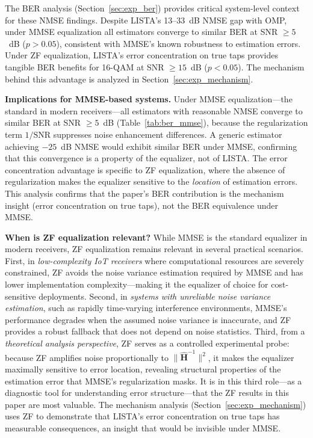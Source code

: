 \documentclass[a4paper,fleqn]{cas-sc}
\begin{document}
The BER analysis (Section~\ref{sec:exp_ber}) provides critical system-level context for these NMSE findings. Despite LISTA's 13--33~dB NMSE gap with OMP, under MMSE equalization all estimators converge to similar BER at SNR $\geq 5$~dB ($p > 0.05$), consistent with MMSE's known robustness to estimation errors. Under ZF equalization, LISTA's error concentration on true taps provides tangible BER benefits for 16-QAM at SNR $\geq 15$~dB ($p < 0.05$). The mechanism behind this advantage is analyzed in Section~\ref{sec:exp_mechanism}.

\textbf{Implications for MMSE-based systems.} Under MMSE equalization---the standard in modern receivers---all estimators with reasonable NMSE converge to similar BER at SNR $\geq 5$~dB (Table~\ref{tab:ber_mmse}), because the regularization term $1/\text{SNR}$ suppresses noise enhancement differences. A generic estimator achieving $-25$~dB NMSE would exhibit similar BER under MMSE, confirming that this convergence is a property of the equalizer, not of LISTA. The error concentration advantage is specific to ZF equalization, where the absence of regularization makes the equalizer sensitive to the \emph{location} of estimation errors. This analysis confirms that the paper's BER contribution is the mechanism insight (error concentration on true taps), not the BER equivalence under MMSE.

\textbf{When is ZF equalization relevant?} While MMSE is the standard equalizer in modern receivers, ZF equalization remains relevant in several practical scenarios. First, in \emph{low-complexity IoT receivers} where computational resources are severely constrained, ZF avoids the noise variance estimation required by MMSE and has lower implementation complexity---making it the equalizer of choice for cost-sensitive deployments. Second, in \emph{systems with unreliable noise variance estimation}, such as rapidly time-varying interference environments, MMSE's performance degrades when the assumed noise variance is inaccurate, and ZF provides a robust fallback that does not depend on noise statistics. Third, from a \emph{theoretical analysis perspective}, ZF serves as a controlled experimental probe: because ZF amplifies noise proportionally to $\|\hat{\mathbf{H}}^{-1}\|^2$, it makes the equalizer maximally sensitive to error location, revealing structural properties of the estimation error that MMSE's regularization masks. It is in this third role---as a diagnostic tool for understanding error structure---that the ZF results in this paper are most valuable. The mechanism analysis (Section~\ref{sec:exp_mechanism}) uses ZF to demonstrate that LISTA's error concentration on true taps has measurable consequences, an insight that would be invisible under MMSE.
\end{document}
